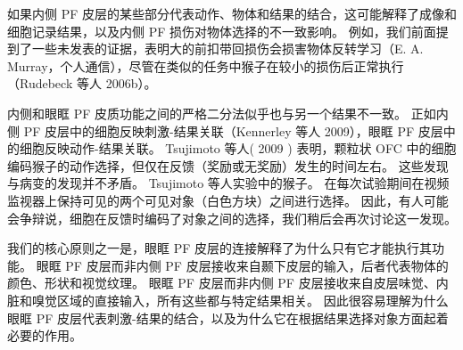 如果内侧 PF 皮层的某些部分代表动作、物体和结果的结合，这可能解释了成像和细胞记录结果，以及内侧 PF 损伤对物体选择的不一致影响。 例如，我们前面提到了一些未发表的证据，表明大的前扣带回损伤会损害物体反转学习（E. A. Murray，个人通信），尽管在类似的任务中猴子在较小的损伤后正常执行（Rudebeck 等人 2006b）。\par
内侧和眼眶 PF 皮质功能之间的严格二分法似乎也与另一个结果不一致。 正如内侧 PF 皮层中的细胞反映刺激-结果关联（Kennerley 等人 2009），眼眶 PF 皮层中的细胞反映动作-结果关联。 Tsujimoto 等人( 2009 ) 表明，颗粒状 OFC 中的细胞编码猴子的动作选择，但仅在反馈（奖励或无奖励）发生的时间左右。 这些发现与病变的发现并不矛盾。 Tsujimoto 等人实验中的猴子。 在每次试验期间在视频监视器上保持可见的两个可见对象（白色方块）之间进行选择。 因此，有人可能会争辩说，细胞在反馈时编码了对象之间的选择，我们稍后会再次讨论这一发现。\par
我们的核心原则之一是，眼眶 PF 皮层的连接解释了为什么只有它才能执行其功能。 眼眶 PF 皮层而非内侧 PF 皮层接收来自颞下皮层的输入，后者代表物体的颜色、形状和视觉纹理。 眼眶 PF 皮层而非内侧 PF 皮层接收来自皮层味觉、内脏和嗅觉区域的直接输入，所有这些都与特定结果相关。 因此很容易理解为什么眼眶 PF 皮层代表刺激-结果的结合，以及为什么它在根据结果选择对象方面起着必要的作用。\par
